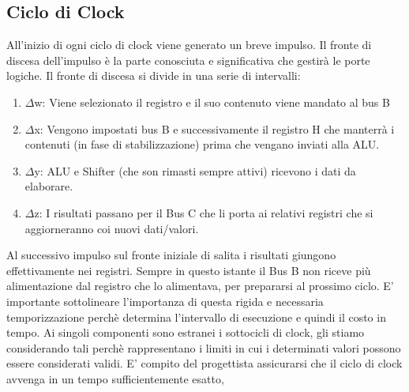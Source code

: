 \subsection{Ciclo di Clock}
All'inizio di ogni ciclo di clock viene generato un breve impulso. Il fronte di discesa dell'impulso è la parte conosciuta e significativa che gestirà le porte logiche. Il fronte di discesa si divide in una serie di intervalli:
\begin{enumerate}
\item $\Delta$w: Viene selezionato il registro e il suo contenuto viene mandato al bus B
\item $\Delta$x:  Vengono impostati bus B e successivamente il registro H che manterrà i contenuti (in fase di stabilizzazione) prima che vengano inviati alla ALU. 
\item $\Delta$y: ALU e Shifter (che son rimasti sempre attivi) ricevono i dati da elaborare.  
\item $\Delta$z: I risultati passano per il Bus C che li porta ai relativi registri che si aggiorneranno coi nuovi dati/valori.
\end{enumerate}
Al successivo impulso sul fronte iniziale di salita i risultati giungono effettivamente nei registri. Sempre in questo istante il Bus B non riceve più alimentazione dal registro che lo alimentava, per prepararsi al prossimo ciclo. E' importante sottolineare l'importanza di questa rigida e necessaria temporizzazione perchè determina l'intervallo di esecuzione e quindi il costo in tempo. Ai singoli componenti sono estranei i sottocicli di clock, gli stiamo considerando tali perchè rappresentano i limiti in cui i determinati valori possono essere considerati validi. E' compito del progettista assicurarsi che il ciclo di clock avvenga in un tempo sufficientemente esatto,
